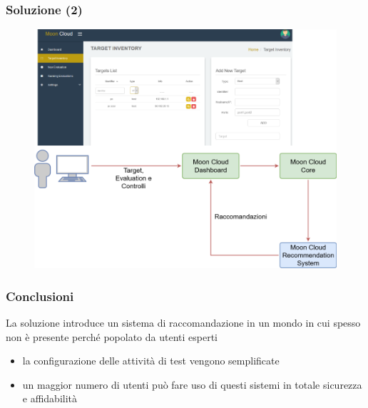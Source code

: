 \begin{frame}
    \frametitle{Soluzione (2)}
    \begin{figure}
        \includegraphics[scale=0.28]{images/UML_MoonCloud_HowToDoPres}
    \end{figure}
\end{frame}

\begin{frame}
    \frametitle{Conclusioni}
    La soluzione introduce un sistema di raccomandazione in un mondo in cui spesso non è presente perché 
    popolato da utenti esperti
    \begin{itemize}
        \item la configurazione delle attività di test vengono semplificate
        \item un maggior numero di utenti può fare uso di questi sistemi in totale sicurezza e affidabilità
    \end{itemize}
\end{frame}


